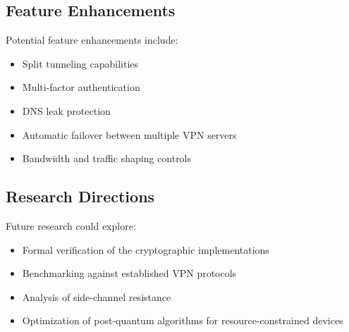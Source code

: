 \documentclass[12pt,a4paper]{report}
\begin{document}
\subsection{Feature Enhancements}
Potential feature enhancements include:
\begin{itemize}
    \item Split tunneling capabilities
    \item Multi-factor authentication
    \item DNS leak protection
    \item Automatic failover between multiple VPN servers
    \item Bandwidth and traffic shaping controls
\end{itemize}

\subsection{Research Directions}
Future research could explore:
\begin{itemize}
    \item Formal verification of the cryptographic implementations
    \item Benchmarking against established VPN protocols
    \item Analysis of side-channel resistance
    \item Optimization of post-quantum algorithms for resource-constrained devices
\end{itemize}
\end{document}
